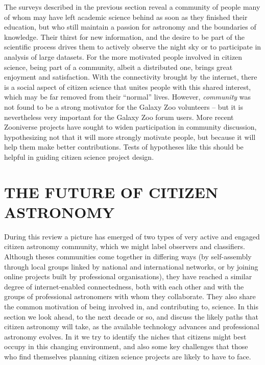 \documentclass{ar2e}
\begin{document}
The surveys described in the previous section reveal a community of people many
of whom may have left academic science behind as soon as they finished their 
education, but who still maintain a passion for astronomy and the boundaries of
knowledge.  Their thirst for new information, and the  desire to be part of the 
scientific process drives them to actively observe the  night sky or to
participate in analysis of large datasets.  For the more motivated people
involved in citizen science, being part of a community,  albeit a distributed
one, brings great enjoyment and satisfaction.  With the connectivity brought by
the internet, there is a social  aspect of citizen science that unites people
with this shared interest, which may be far removed from their ``normal'' 
lives. However, {\it community} was not found to be a strong motivator for the
Galaxy Zoo volunteers -- but it is nevertheless very important for the Galaxy
Zoo forum users. More recent Zooniverse projects have sought to widen
participation in community discussion, hypothesizing not that it will more
strongly motivate people, but because it will help them make better
contributions. Tests of hypotheses like this should be helpful in guiding
citizen science project design.



\section{THE FUTURE OF CITIZEN ASTRONOMY}
\label{sec:future}


During this review a picture has emerged of two types of very active and engaged
citizen astronomy community, which we might label observers and classifiers. 
Although theses communities come together in differing ways (by self-assembly
through local groups linked by national and international networks, or by
joining online projects built by professional organisations), they have reached
a similar degree of internet-enabled connectedness, both with each other and
with the groups of professional astronomers with whom they  collaborate. They
also share the common motivation of being involved in, and contributing to,
science. In this section we look ahead, to the next decade or so, and discuss
the likely paths that citizen astronomy will take, as the available technology
advances and professional astronomy evolves. In it we try to identify the niches
that citizens might best occupy in this changing environment, and also some key
challenges that those who find themselves planning citizen science projects are
likely to have to face.
\end{document}
